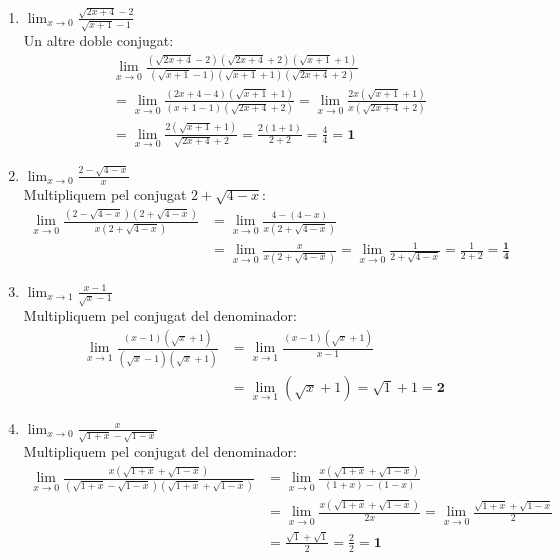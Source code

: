 \documentclass[12pt,a4paper]{article}
\begin{document}
\begin{enumerate}[label=\textbf{3.\arabic*.}, leftmargin=*, itemsep=0.8cm]
    \item $\displaystyle \lim_{x \to 0} \frac{\sqrt{2x+4}-2}{\sqrt{x+1}-1}$ \\
    Un altre doble conjugat:
    \begin{align*}
        &\lim_{x \to 0} \frac{(\sqrt{2x+4}-2)(\sqrt{2x+4}+2)(\sqrt{x+1}+1)}{(\sqrt{x+1}-1)(\sqrt{x+1}+1)(\sqrt{2x+4}+2)} \\
        &= \lim_{x \to 0} \frac{(2x+4-4)(\sqrt{x+1}+1)}{(x+1-1)(\sqrt{2x+4}+2)} = \lim_{x \to 0} \frac{2x(\sqrt{x+1}+1)}{x(\sqrt{2x+4}+2)} \\
        &= \lim_{x \to 0} \frac{2(\sqrt{x+1}+1)}{\sqrt{2x+4}+2} = \frac{2(1+1)}{2+2} = \frac{4}{4} = \mathbf{1}
    \end{align*}

    \item $\displaystyle \lim_{x \to 0} \frac{2-\sqrt{4-x}}{x}$ \\
    Multipliquem pel conjugat $2+\sqrt{4-x}$:
    \begin{align*}
        \lim_{x \to 0} \frac{(2-\sqrt{4-x})(2+\sqrt{4-x})}{x(2+\sqrt{4-x})} &= \lim_{x \to 0} \frac{4 - (4-x)}{x(2+\sqrt{4-x})} \\
        &= \lim_{x \to 0} \frac{x}{x(2+\sqrt{4-x})} = \lim_{x \to 0} \frac{1}{2+\sqrt{4-x}} = \frac{1}{2+2} = \mathbf{\frac{1}{4}}
    \end{align*}

    \item $\displaystyle \lim_{x \to 1} \frac{x-1}{\sqrt{x}-1}$ \\
    Multipliquem pel conjugat del denominador:
    \begin{align*}
        \lim_{x \to 1} \frac{(x-1)(\sqrt{x}+1)}{(\sqrt{x}-1)(\sqrt{x}+1)} &= \lim_{x \to 1} \frac{(x-1)(\sqrt{x}+1)}{x-1} \\
        &= \lim_{x \to 1} (\sqrt{x}+1) = \sqrt{1}+1 = \mathbf{2}
    \end{align*}

    \item $\displaystyle \lim_{x \to 0} \frac{x}{\sqrt{1+x}-\sqrt{1-x}}$ \\
    Multipliquem pel conjugat del denominador:
    \begin{align*}
        \lim_{x \to 0} \frac{x(\sqrt{1+x}+\sqrt{1-x})}{(\sqrt{1+x}-\sqrt{1-x})(\sqrt{1+x}+\sqrt{1-x})} &= \lim_{x \to 0} \frac{x(\sqrt{1+x}+\sqrt{1-x})}{(1+x) - (1-x)} \\
        &= \lim_{x \to 0} \frac{x(\sqrt{1+x}+\sqrt{1-x})}{2x} = \lim_{x \to 0} \frac{\sqrt{1+x}+\sqrt{1-x}}{2} \\
        &= \frac{\sqrt{1}+\sqrt{1}}{2} = \frac{2}{2} = \mathbf{1}
    \end{align*}


\end{enumerate}
\end{document}
